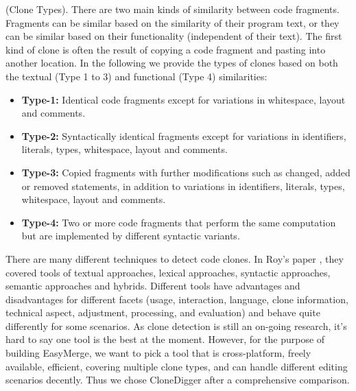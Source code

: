 \documentclass{acm_proc_article-sp}
\begin{document}
\begin{definition}
(Clone Types). There are two main kinds of similarity between code fragments. Fragments can be similar based on the similarity of their program text,
or they can be similar based on their functionality (independent of their text). The first kind of clone is often the result of copying a code fragment and
pasting into another location. In the following we provide the types of clones based on both the textual (Type 1 to 3)\cite{bellon} and functional (Type 4)\cite{gabel, komondoor} similarities:

\begin{itemize}
\item {\bf Type-1:} Identical code fragments except for variations in whitespace, layout and comments.
\item {\bf Type-2:} Syntactically identical fragments except for variations in identifiers, literals, types, whitespace, layout and comments.
\item {\bf Type-3:} Copied fragments with further modifications such as changed, added or removed statements, in addition to variations in identifiers, literals, types, whitespace, layout and comments.
\item {\bf Type-4:} Two or more code fragments that perform the same computation but are implemented by different syntactic variants.
\end{itemize}
\end{definition}

There are many different techniques to detect code clones. In Roy's paper \cite{roy2}, they covered tools of textual approaches, lexical approaches, syntactic approaches,
semantic approaches and hybrids. Different tools have advantages and disadvantages for different facets (usage, interaction, language, clone information, technical aspect, 
adjustment, processing, and evaluation) and behave quite differently for some scenarios. As clone detection is still an on-going research, it's hard to say one tool is the best
at the moment. However, for the purpose of building EasyMerge, we want to pick a tool that is cross-platform, freely available, efficient, covering multiple clone types, and can
handle different editing scenarios decently. Thus we chose CloneDigger \cite{bulychev} after a comprehensive comparison.
\end{document}
